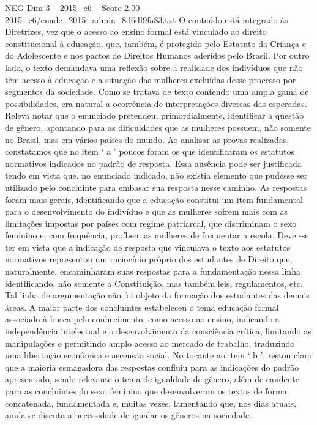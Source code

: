 \begin{textsample}{NEG Dim 3 – 2015\_c6 – Score 2.00 – 2015\_c6/enade\_2015\_admin\_8d6df9fa83.txt}
O conteúdo está integrado às Diretrizes, vez que o acesso ao ensino formal está vinculado ao direito constitucional à educação, que, também, é protegido pelo Estatuto da Criança e do Adolescente e nos pactos de Direitos Humanos aderidos pelo Brasil.
Por outro lado, o texto demandava uma reflexão sobre a realidade dos indivíduos que não têm acesso à educação e a situação das mulheres excluídas desse processo por segmentos da sociedade.
Como se tratava de texto contendo uma ampla gama de possibilidades, era natural a ocorrência de interpretações diversas das esperadas.
Releva notar que o enunciado pretendeu, primordialmente, identificar a questão de gênero, apontando para as dificuldades que as mulheres possuem, não somente no Brasil, mas em vários países do mundo.
Ao analisar as provas realizadas, constatamos que no item ‘ a ’ poucos foram os que identificaram os estatutos normativos indicados no padrão de resposta.
Essa ausência pode ser justificada tendo em vista que, no enunciado indicado, não existia elemento que pudesse ser utilizado pelo concluinte para embasar sua resposta nesse caminho.
As respostas foram mais gerais, identificando que a educação constitui um item fundamental para o desenvolvimento do indivíduo e que as mulheres sofrem mais com as limitações impostas por países com regime patriarcal, que discriminam o sexo feminino e, com frequência, proíbem as mulheres de frequentar a escola.
Deve -se ter em vista que a indicação de resposta que vinculava o texto aos estatutos normativos representou um raciocínio próprio dos estudantes de Direito que, naturalmente, encaminharam suas respostas para a fundamentação nessa linha identificando, não somente a Constituição, mas também leis, regulamentos, etc.
Tal linha de argumentação não foi objeto da formação dos estudantes das demais áreas.
A maior parte dos concluintes estabeleceu o tema educação formal associado à busca pelo conhecimento, como acesso ao ensino, indicando a independência intelectual e o desenvolvimento da consciência crítica, limitando as manipulações e permitindo amplo acesso ao mercado de trabalho, traduzindo uma libertação econômica e ascensão social.
No tocante ao item ‘ b ’, restou claro que a maioria esmagadora das respostas confluiu para as indicações do padrão apresentado, sendo relevante o tema de igualdade de gênero, além de candente para as concluintes do sexo feminino que desenvolveram os textos de forma concatenada, fundamentada e, muitas vezes, lamentando que, nos dias atuais, ainda se discuta a necessidade de igualar os gêneros na sociedade.

\end{textsample}
